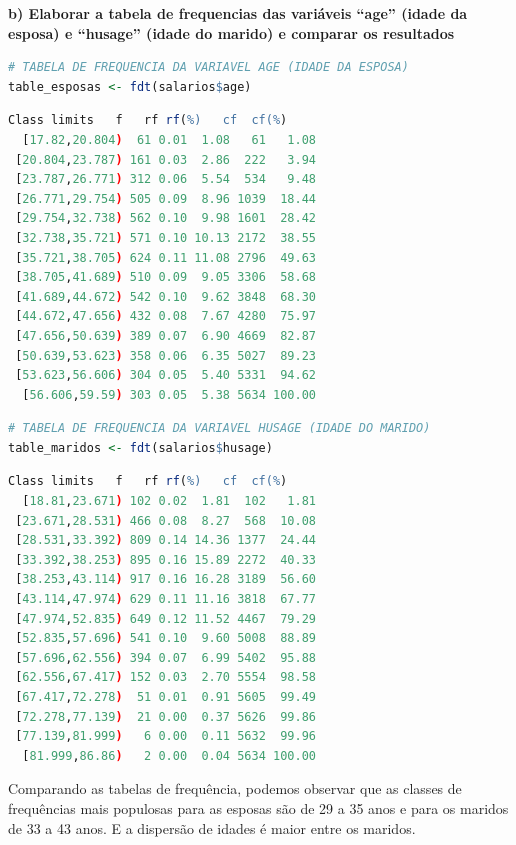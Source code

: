 \begin{adjustwidth}{1em}{}
\textbf{b) Elaborar a tabela de frequencias das variáveis “age” (idade da esposa) e “husage” (idade do marido) e
comparar os resultados}
\end{adjustwidth}
\begin{lstlisting}[language=R, style=input] 
# TABELA DE FREQUENCIA DA VARIAVEL AGE (IDADE DA ESPOSA)
table_esposas <- fdt(salarios$age)
\end{lstlisting}
\begin{lstlisting}[language=R, style=output] 
    Class limits   f   rf rf(%)   cf  cf(%)
  [17.82,20.804)  61 0.01  1.08   61   1.08
 [20.804,23.787) 161 0.03  2.86  222   3.94
 [23.787,26.771) 312 0.06  5.54  534   9.48
 [26.771,29.754) 505 0.09  8.96 1039  18.44
 [29.754,32.738) 562 0.10  9.98 1601  28.42
 [32.738,35.721) 571 0.10 10.13 2172  38.55
 [35.721,38.705) 624 0.11 11.08 2796  49.63
 [38.705,41.689) 510 0.09  9.05 3306  58.68
 [41.689,44.672) 542 0.10  9.62 3848  68.30
 [44.672,47.656) 432 0.08  7.67 4280  75.97
 [47.656,50.639) 389 0.07  6.90 4669  82.87
 [50.639,53.623) 358 0.06  6.35 5027  89.23
 [53.623,56.606) 304 0.05  5.40 5331  94.62
  [56.606,59.59) 303 0.05  5.38 5634 100.00
\end{lstlisting}

\begin{lstlisting}[language=R, style=input] 
# TABELA DE FREQUENCIA DA VARIAVEL HUSAGE (IDADE DO MARIDO)
table_maridos <- fdt(salarios$husage)
\end{lstlisting}
\begin{lstlisting}[language=R, style=output] 
    Class limits   f   rf rf(%)   cf  cf(%)
  [18.81,23.671) 102 0.02  1.81  102   1.81
 [23.671,28.531) 466 0.08  8.27  568  10.08
 [28.531,33.392) 809 0.14 14.36 1377  24.44
 [33.392,38.253) 895 0.16 15.89 2272  40.33
 [38.253,43.114) 917 0.16 16.28 3189  56.60
 [43.114,47.974) 629 0.11 11.16 3818  67.77
 [47.974,52.835) 649 0.12 11.52 4467  79.29
 [52.835,57.696) 541 0.10  9.60 5008  88.89
 [57.696,62.556) 394 0.07  6.99 5402  95.88
 [62.556,67.417) 152 0.03  2.70 5554  98.58
 [67.417,72.278)  51 0.01  0.91 5605  99.49
 [72.278,77.139)  21 0.00  0.37 5626  99.86
 [77.139,81.999)   6 0.00  0.11 5632  99.96
  [81.999,86.86)   2 0.00  0.04 5634 100.00
\end{lstlisting}

Comparando as tabelas de frequência, podemos observar que as classes de frequências mais populosas para as esposas são de 29 a 35 anos e para os maridos de 33 a 43 anos. E a dispersão de idades é maior entre os maridos.


